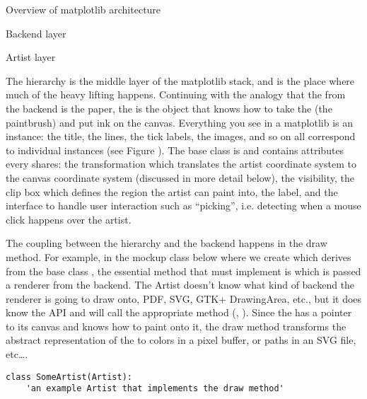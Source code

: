 \begin{aosasect1}{Overview of matplotlib architecture}
\begin{aosasect2}{Backend layer}

\end{aosasect2}

\begin{aosasect2}{Artist layer}

The  hierarchy is the middle layer of the matplotlib
stack, and is the place where much of the heavy lifting happens.
Continuing with the analogy that the  from the backend
is the paper, the  is the object that knows how to take the
 (the paintbrush) and put ink on the canvas.  Everything you
see in a matplotlib  is an  instance: the title, the
lines, the tick labels, the images, and so on all correspond to
individual  instances (see Figure
\cite{fig.matplotlib.artists_tree}).  The base class is
 and contains attributes every 
shares: the transformation which translates the artist coordinate
system to the canvas coordinate system (discussed in more detail
below), the visibility, the clip box which defines the region the
artist can paint into, the label, and the interface to handle user
interaction such as ``picking'', i.e. detecting when a mouse click
happens over the artist.



The coupling between the  hierarchy and the backend
happens in the draw method.  For example, in the mockup class below
where we create  which derives from the base class
, the essential method that  must
implement is  which is passed a renderer from the backend.
The Artist doesn't know what kind of backend the renderer is going to
draw onto, PDF, SVG, GTK+ DrawingArea, etc., but it does know the
 API and will call the appropriate method
(, ).  Since the  has
a pointer to its canvas and knows how to paint onto it, the draw
method transforms the abstract representation of the  to
colors in a pixel buffer, or paths in an SVG file, etc\dots{}.

\begin{verbatim}
class SomeArtist(Artist):
    'an example Artist that implements the draw method'


\end{verbatim}
\end{aosasect2}
\end{aosasect1}
